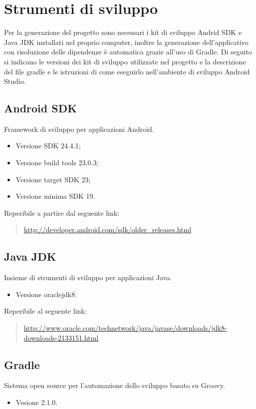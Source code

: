 \documentclass[../ManualeSviluppatore.tex]{subfiles}
\begin{document}
\section{Strumenti di sviluppo}
	
	Per la generazione del progetto sono necessari i kit di sviluppo Andrid SDK e \gls{Java} JDK installati nel proprio computer, inoltre la generazione dell'applicativo con risoluzione delle dipendenze è automatica grazie all'uso di Gradle.
	Di seguito si indicano le versioni dei kit di sviluppo utilizzate nel progetto e la descrizione del file gradle e le istruzioni di come eseguirlo nell'ambiente di sviluppo \gls{Android Studio}.

	\subsection{Android SDK}
	 \gls{Framework} di sviluppo per applicazioni \gls{Android}.
		\begin{itemize} 
			\item Versione SDK 24.4.1;
			\item Versione build tools 23.0.3;
			\item Versione target SDK 23;
			\item Versione minima SDK 19.
		\end{itemize}
		Reperibile a partire dal seguente link:
		\begin{quote}
			\centering
			\url{http://developer.android.com/sdk/older_releases.html}
		\end{quote}
		
	\subsection{Java JDK}
		Insieme di strumenti di sviluppo per applicazioni \gls{Java}. 
		\begin{itemize} 
			\item Versione oraclejdk8.
		\end{itemize}
		Reperibile al seguente link:
		\begin{quote}
			\centering
			\url{http://www.oracle.com/technetwork/java/javase/downloads/jdk8-downloads-2133151.html}
		\end{quote}
		
	\newpage
	\subsection{Gradle}
	\label{subsec:Gradle}
		Sistema \gls{open source} per l'automazione dello sviluppo basato su Groovy.
		\begin{itemize} 
			\item Vesione 2.1.0.
		\end{itemize}
		
\end{document}
